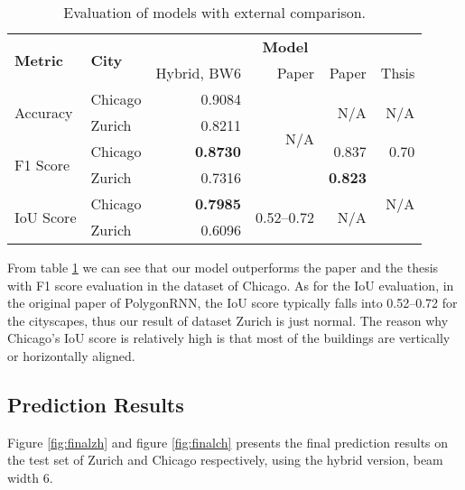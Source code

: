 \begin{table}[!h]
	\centering
	\caption[Evaluation of models with external comparison]{Evaluation of models with external comparison.}
	\label{tab:evalmodex}
	\begin{tabular}{l|l|r|r|r|r}
	\hline
	\multirow{2}{*}{\textbf{Metric}} & \multirow{2}{*}{\textbf{City}} & \multicolumn{4}{c}{\textbf{Model}} \\ \cline{3-6}
	 & & Hybrid, BW6\footnotemark[1] & Paper \cite{polygonrnn} & Paper \cite{mspascal} & Thsis \cite{msnadine} \\ \hline
	\multirow{2}{*}{Accuracy} & Chicago & 0.9084 & \multirow{4}{*}{N/A} & \multirow{2}{*}{N/A} & \multirow{2}{*}{N/A} \\ \cline{2-3}
	& Zurich & 0.8211 & & \\ \cline{1-3}\cline{5-6}
	\multirow{2}{*}{F1 Score} & Chicago & \textbf{0.8730} & & 0.837 & 0.70 \\ \cline{2-3}\cline{5-6}
	& Zurich & 0.7316 & & \textbf{0.823} & \multirow{3}{*}{N/A} \\ \cline{1-5}
	\multirow{2}{*}{IoU Score} & Chicago & \textbf{0.7985} & \multirow{2}{*}{0.52--0.72\footnotemark[2]} & \multirow{2}{*}{N/A} & \\ \cline{2-3}
	& Zurich & 0.6096 & & & \\
	\hline
\end{tabular}
\end{table}

From table \ref{tab:evalmodex} we can see that our model outperforms the paper \cite{mspascal} and the thesis \cite{msnadine} with F1 score evaluation in the dataset of Chicago. As for the IoU evaluation, in the original paper of PolygonRNN, the IoU score typically falls into 0.52--0.72 for the cityscapes, thus our result of dataset Zurich is just normal. The reason why Chicago’s IoU score is relatively high is that most of the buildings are vertically or horizontally aligned.

\subsection{Prediction Results}\label{predres}
Figure \ref{fig:finalzh} and figure \ref{fig:finalch} presents the final prediction results on the test set of Zurich and Chicago respectively, using the hybrid version, beam width 6.




